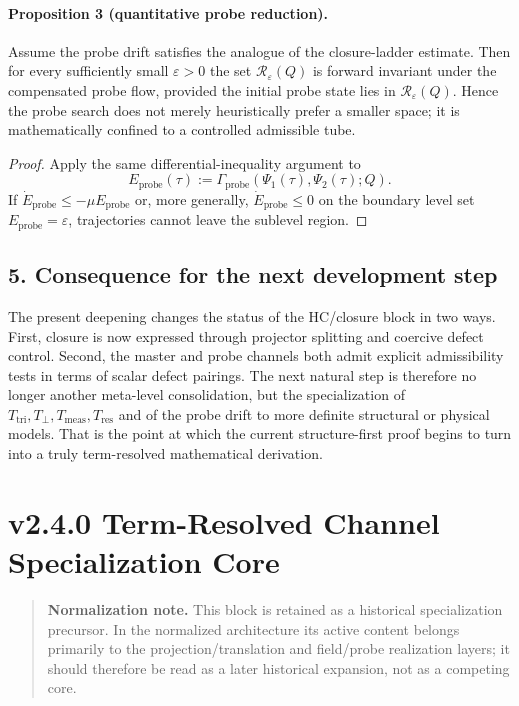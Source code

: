 \paragraph{Proposition 3 (quantitative probe reduction).}
Assume the probe drift satisfies the analogue of the closure-ladder estimate.
Then for every sufficiently small $\varepsilon>0$ the set
$\mathcal R_\varepsilon(Q)$ is forward invariant under the compensated probe flow,
provided the initial probe state lies in $\mathcal R_\varepsilon(Q)$. Hence the
probe search does not merely heuristically prefer a smaller space; it is
mathematically confined to a controlled admissible tube.

\begin{proof}
Apply the same differential-inequality argument to
\[
E_{\mathrm{probe}}(\tau):=\Gamma_{\mathrm{probe}}(\Psi_1(\tau),\Psi_2(\tau);Q).
\]
If $\dot E_{\mathrm{probe}}\le -\mu E_{\mathrm{probe}}$ or, more generally, $\dot E_{\mathrm{probe}}\le 0$ on the boundary level set $E_{\mathrm{probe}}=\varepsilon$, trajectories cannot leave the sublevel region.
\end{proof}

\subsection*{5. Consequence for the next development step}
The present deepening changes the status of the HC/closure block in two ways.
First, closure is now expressed through projector splitting and coercive defect
control. Second, the master and probe channels both admit explicit admissibility
tests in terms of scalar defect pairings. The next natural step is therefore no
longer another meta-level consolidation, but the specialization of
$T_{\mathrm{tri}},T_{\perp},T_{\mathrm{meas}},T_{\mathrm{res}}$ and of the probe drift to
more definite structural or physical models. That is the point at which the
current structure-first proof begins to turn into a truly term-resolved
mathematical derivation.


\section*{v2.4.0 Term-Resolved Channel Specialization Core}
\begin{quote}
\textbf{Normalization note.} This block is retained as a historical specialization precursor. In the normalized architecture its active content belongs primarily to the projection/translation and field/probe realization layers; it should therefore be read as a later historical expansion, not as a competing core.
\end{quote}

